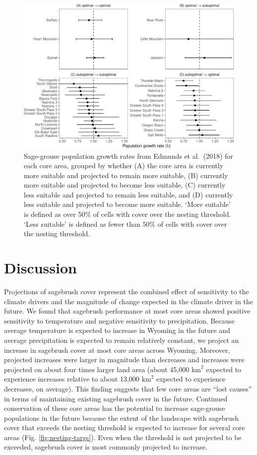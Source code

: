 \documentclass[
  12pt,
]{article}
\begin{document}
\begin{figure}
\centering
\includegraphics{sageCastManuscript_files/figure-latex/lambda-compares-1.pdf}
\caption{\label{fig:lambda-compares}Sage-grouse population growth rates from Edmunds et al.~(2018) for each core area, grouped by whether (A) the core area is currently more suitable and projected to remain more suitable, (B) currently more suitable and projected to become less suitable, (C) currently less suitable and projected to remain less suitable, and (D) currently less suitable and projected to become more suitable. `More suitable' is defined as over 50\% of cells with cover over the nesting threshold. `Less suitable' is defined as fewer than 50\% of cells with cover over the nesting threshold.}
\end{figure}

\hypertarget{discussion}{%
\section{Discussion}\label{discussion}}

Projections of sagebrush cover represent the combined effect of sensitivity to the climate drivers and the magnitude of change expected in the climate driver in the future.
We found that sagebrush performance at most core areas showed positive sensitivity to temperature and negative sensitivity to precipitation.
Because average temperature is expected to increase in Wyoming in the future and average precipitation is expected to remain relatively constant, we project an increase in sagebrush cover at most core areas across Wyoming.
Moreover, projected increases were larger in magnitude than decreases and increases were projected on about four times larger land area (about 45,000 \(\text{km}^2\) expected to experience increases relative to about 13,000 \(\text{km}^2\) expected to experience decreases, on average).
This finding suggests that few core areas are ``lost causes'' in terms of maintaining existing sagebrush cover in the future.
Continued conservation of these core areas has the potential to increase sage-grouse populations in the future because the extent of the landscape with sagebrush cover that exceeds the nesting threshold is expected to increase for several core areas (Fig. \ref{fig:nesting-targs}).
Even when the threshold is not projected to be exceeded, sagebrush cover is most commonly projected to increase.
\end{document}
